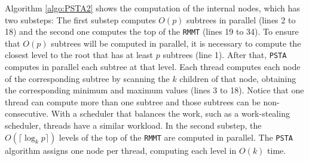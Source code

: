 Algorithm \ref{algo:PSTA2} shows the computation of the internal
nodes, which has two substeps: The first substep computes $O(p)$
subtrees in parallel (lines 2 to 18) and the second one computes the
top of the {\tt RMMT} (lines 19 to 34). To ensure that $O(p)$ subtrees
will be computed in parallel, it is necessary to compute the closest
level to the root that has at least $p$ subtrees (line 1). After that,
{\tt PSTA} computes in parallel each subtree at that level. Each
thread computes each node of the corresponding subtree by scanning the
$k$ children of that node, obtaining the corresponding minimum and
maximum values (lines 3 to 18). Notice that one thread can compute
more than one subtree and those subtrees can be non-consecutive. With
a scheduler that balances the work, such as a work-stealing scheduler,
threads have a similar workload. In the second substep, the $O(\lceil
\log_{k}p \rceil)$ levels of the top of the {\tt RMMT} are computed in
parallel. The {\tt PSTA} algorithm assigns one node per thread,
computing each level in $O(k)$ time.

